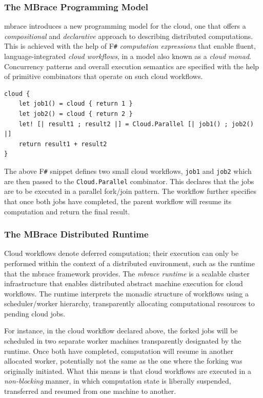 \documentclass[9pt,a4paper]{article}
\newcommand{\mbrace}{mbrace}
\newcommand{\Mbrace}{\mbrace}
\newcommand{\TitularMbrace}{MBrace}
\newcommand{\fsharp}{F\texttt \#}
\begin{document}
\subsubsection*{The \TitularMbrace{} Programming Model}

\Mbrace{} introduces a new programming model for the cloud, one that offers a 
\emph{compositional} and \emph{declarative} approach to describing distributed 
computations. This is achieved with the help of \fsharp{} \emph{computation expressions} 
that enable fluent, language-integrated \emph{cloud workflows}, in a model also known
as a \emph{cloud monad}. Concurrency patterns and overall execution semantics are specified 
with the help of primitive combinators that operate on such cloud workflows.
%
\begin{lstlisting}
cloud {
	let job1() = cloud { return 1 }
	let job2() = cloud { return 2 }
	let! [| result1 ; result2 |] = Cloud.Parallel [| job1() ; job2() |]	
	return result1 + result2
}
\end{lstlisting}
The above \fsharp{} snippet defines two small cloud workflows, \texttt{job1} and
\texttt{job2} which are then passed to the \texttt{Cloud.Parallel}
combinator. This declares that the jobs are to be executed in a parallel
fork/join pattern. The workflow further specifies that once both jobs have
completed, the parent workflow will resume its computation and return the final
result.
%

\subsubsection*{The \TitularMbrace{} Distributed Runtime}

Cloud workflows denote deferred computation; their execution can only be performed within
the context of a distributed environment, such as the runtime that the \mbrace{}
framework provides. The \emph{\mbrace{} runtime} is a scalable cluster infrastructure that
enables distributed abstract machine execution for cloud workflows.
The runtime interprets the monadic structure of workflows using a scheduler/worker hierarchy, 
transparently allocating computational resources to pending cloud jobs.

For instance, in the cloud workflow declared above, the forked jobs will be
scheduled in two separate worker machines transparently designated by the
runtime. Once both have completed, computation will resume in another allocated
worker, potentially not the same as the one where the forking was originally
initiated. What this means is that cloud workflows are executed in a
\emph{non-blocking} manner, in which computation state is liberally suspended,
transferred and resumed from one machine to another.
\end{document}
